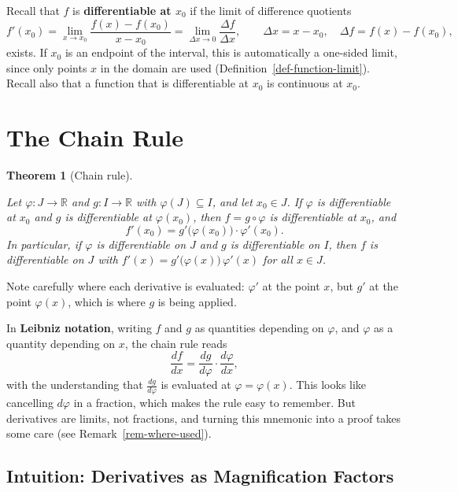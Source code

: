 \documentclass[
  letterpaper,
  DIV=11,
  numbers=noendperiod]{scrreprt}
\theoremstyle{plain}
\theoremstyle{plain}
\theoremstyle{definition}
\theoremstyle{definition}
\theoremstyle{definition}
\theoremstyle{plain}
\newtheorem{theorem}{Theorem}[chapter]
\theoremstyle{plain}
\theoremstyle{remark}
\begin{document}
Recall that \(f\) is \textbf{differentiable at \(x_0\)} if the limit of
difference quotients \[
f'(x_0) = \lim_{x\to x_0}\frac{f(x)-f(x_0)}{x-x_0} = \lim_{\Delta x\to 0}\frac{\Delta f}{\Delta x},
\qquad \Delta x = x-x_0,\quad \Delta f = f(x)-f(x_0),
\] exists. If \(x_0\) is an endpoint of the interval, this is
automatically a one-sided limit, since only points \(x\) in the domain
are used (Definition~\ref{def-function-limit}). Recall also that a
function that is differentiable at \(x_0\) is continuous at \(x_0\).

\section{The Chain Rule}\label{the-chain-rule}

\begin{theorem}[Chain
rule]\protect\hypertarget{thm-chain-rule}{}\label{thm-chain-rule}

Let \(\varphi\colon J\to\mathbb{R}\) and \(g\colon I\to\mathbb{R}\) with
\(\varphi(J)\subseteq I\), and let \(x_0\in J\). If \(\varphi\) is
differentiable at \(x_0\) and \(g\) is differentiable at
\(\varphi(x_0)\), then \(f = g\circ\varphi\) is differentiable at
\(x_0\), and \[
f'(x_0) = g'\big(\varphi(x_0)\big)\cdot\varphi'(x_0).
\] In particular, if \(\varphi\) is differentiable on \(J\) and \(g\) is
differentiable on \(I\), then \(f\) is differentiable on \(J\) with
\(f'(x) = g'\big(\varphi(x)\big)\,\varphi'(x)\) for all \(x\in J\).

\end{theorem}

Note carefully where each derivative is evaluated: \(\varphi'\) at the
point \(x\), but \(g'\) at the point \(\varphi(x)\), which is where
\(g\) is being applied.

In \textbf{Leibniz notation}, writing \(f\) and \(g\) as quantities
depending on \(\varphi\), and \(\varphi\) as a quantity depending on
\(x\), the chain rule reads \[
\frac{df}{dx} = \frac{dg}{d\varphi}\cdot\frac{d\varphi}{dx},
\] with the understanding that \(\frac{dg}{d\varphi}\) is evaluated at
\(\varphi = \varphi(x)\). This looks like cancelling \(d\varphi\) in a
fraction, which makes the rule easy to remember. But derivatives are
limits, not fractions, and turning this mnemonic into a proof takes some
care (see Remark~\ref{rem-where-used}).

\subsection{Intuition: Derivatives as Magnification
Factors}\label{intuition-derivatives-as-magnification-factors}
\end{document}
